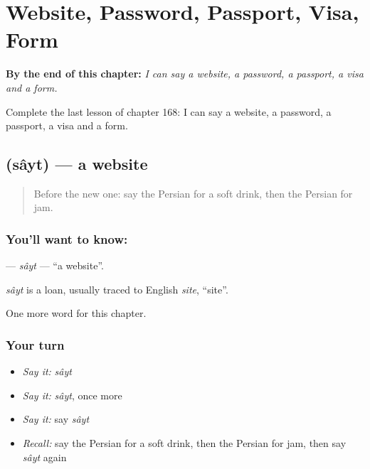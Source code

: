 
\chapter{Website, Password, Passport, Visa, Form}
\label{ch:fa-website-password-passport-visa-form}

\begin{chapteropening}
\textbf{By the end of this chapter:} \emph{I can say a website, a password, a passport, a visa and a form.}

Complete the last lesson of chapter 168: I can say a website, a password, a passport, a visa and a form.
\end{chapteropening}

\section[\texorpdfstring{\fa{سایت} (sâyt)}{سایت (sâyt)}]{ (sâyt) — a website}

\label{lesson:FA-C168-sayt}



\begin{quote}
Before the new one: say the Persian for a soft drink, then the Persian for jam.
\end{quote}

\subsection*{You'll want to know: }
\textbf{} — \emph{sâyt} — \textquotedblleft{}a website\textquotedblright{}.

\begin{cousinweb}
\emph{sâyt} is a loan, usually traced to English \emph{site}, \textquotedblleft{}site\textquotedblright{}.
\end{cousinweb}

\begin{grammarlens}[title={What you've built}]
One more word for this chapter.
\end{grammarlens}

\subsection*{Your turn}
\begin{itemize}
\raggedright
  \item \emph{Say it:} \emph{sâyt}
  \item \emph{Say it:} \emph{sâyt}, once more
  \item \emph{Say it:} say \emph{sâyt}
  \item \emph{Recall:} say the Persian for a soft drink, then the Persian for jam, then say \emph{sâyt} again
\end{itemize}

